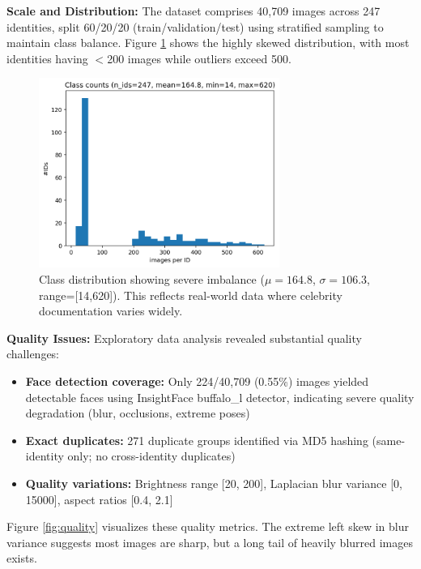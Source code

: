 \documentclass[11pt,a4paper]{article}
\begin{document}
\textbf{Scale and Distribution:} The dataset comprises 40,709 images across 247 identities, split 60/20/20 (train/validation/test) using stratified sampling to maintain class balance. Figure \ref{fig:class_counts} shows the highly skewed distribution, with most identities having $<$200 images while outliers exceed 500.

\begin{figure}[H]
    \centering
    \includegraphics[width=0.7\textwidth]{runs/eda/class_counts.png}
    \caption{Class distribution showing severe imbalance ($\mu=164.8$, $\sigma=106.3$, range=[14,620]). This reflects real-world data where celebrity documentation varies widely.}
    \label{fig:class_counts}
\end{figure}

\textbf{Quality Issues:} Exploratory data analysis revealed substantial quality challenges:
\begin{itemize}
    \item \textbf{Face detection coverage:} Only 224/40,709 (0.55\%) images yielded detectable faces using InsightFace buffalo\_l detector, indicating severe quality degradation (blur, occlusions, extreme poses)
    \item \textbf{Exact duplicates:} 271 duplicate groups identified via MD5 hashing (same-identity only; no cross-identity duplicates)
    \item \textbf{Quality variations:} Brightness range [20, 200], Laplacian blur variance [0, 15000], aspect ratios [0.4, 2.1]
\end{itemize}

Figure \ref{fig:quality} visualizes these quality metrics. The extreme left skew in blur variance suggests most images are sharp, but a long tail of heavily blurred images exists.
\end{document}
